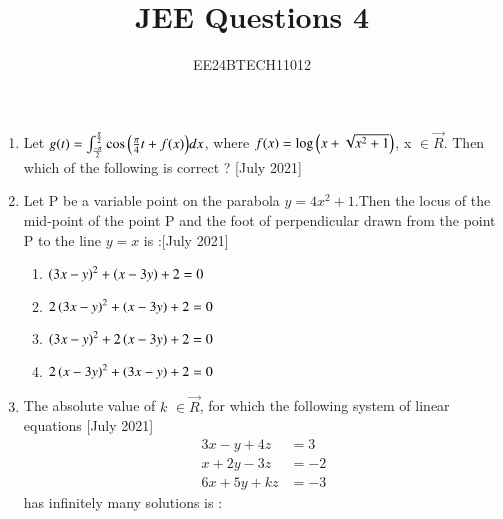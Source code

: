 \documentclass[journal,12pt,onecolumn]{IEEEtran}
\theoremstyle{remark}
\begin{document}

\vspace{3cm}

\title{JEE Questions 4}
\author{EE24BTECH11012}
\maketitle
\newpage
\bigskip

\renewcommand{\thefigure}{\theenumi}
\renewcommand{\thetable}{\theenumi}
\begin{enumerate}
	 	
	\item Let $ g(t) = \int_{\frac{- \pi}{2}}^{\frac{\pi}{2}} \cos{\ensuremath{\left(\frac{\pi}{4}t + f(x)\right)}} dx$, where $f(x) = \log{\ensuremath{\left(x + \sqrt{x^2 + 1}\right)}}$, x $\in \vec{R}$. Then which of the following is correct ? \hfill{[July 2021]}
	 \begin{enumerate}
	 \end{enumerate}
 \item Let P be a variable point on the parabola $y=4x^2+1$.Then the locus of the mid-point of the point P and the foot of perpendicular drawn from the point P to the line $y=x$ is :\hfill{[July 2021]}
	 \begin{enumerate}
		 \item $\left(3x-y\right)^2 + \left(x-3y\right) + 2 = 0$
		 \item $2 \left(3x-y\right)^2 + \left(x-3y\right) + 2 = 0$
		 \item $\left(3x-y\right)^2 + 2\left(x-3y\right) + 2 = 0$
		 \item $2 \left(x-3y\right)^2 + \left(3x-y\right) + 2 = 0$
	 \end{enumerate}
\item The absolute value of $k$ $ \in \vec{R}$, for which the following system of linear equations \hfill{[July 2021]}
		\begin{align}
			3x - y + 4z &= 3 \\ 
			x + 2y - 3z &= -2 \\
			6x + 5y + kz &= -3 
		\end{align}
		has infinitely many solutions is :
	\begin{enumerate}
			\begin{multicols}{4}

\end{multicols}
\end{enumerate}
\end{enumerate}
\end{document}
